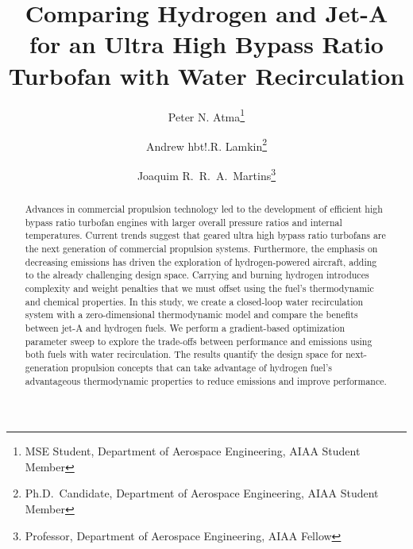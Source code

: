 \documentclass[conf]{new-aiaa}
\title{Comparing Hydrogen and Jet-A for an Ultra High Bypass Ratio Turbofan with Water Recirculation} %
\author{Peter N. Atma\footnote{MSE Student, Department of Aerospace Engineering, AIAA Student Member}}
\author{Andrew hbt!.R. Lamkin\footnote{Ph.D.~Candidate, Department of Aerospace Engineering, AIAA Student Member}}
\author{Joaquim R.~R.~A.~Martins\footnote{Professor, Department of Aerospace Engineering, AIAA Fellow}}
\affil{University of Michigan, Ann Arbor, MI, 48109}
\begin{document}
\maketitle

\begin{abstract}
    Advances in commercial propulsion technology led to the development of efficient high bypass ratio turbofan engines with larger overall pressure ratios and internal temperatures.
    Current trends suggest that geared ultra high bypass ratio turbofans are the next generation of commercial propulsion systems.
    Furthermore, the emphasis on decreasing emissions has driven the exploration of hydrogen-powered aircraft, adding to the already challenging design space.
    Carrying and burning hydrogen introduces complexity and weight penalties that we must offset using the fuel's thermodynamic and chemical properties.
    In this study, we create a closed-loop water recirculation system with a zero-dimensional thermodynamic model and compare the benefits between jet-A and hydrogen fuels.
    We perform a gradient-based optimization parameter sweep to explore the trade-offs between performance and emissions using both fuels with water recirculation.
    The results quantify the design space for next-generation propulsion concepts that can take advantage of hydrogen fuel's advantageous thermodynamic properties to reduce emissions and improve performance.
\end{abstract}
\end{document}
